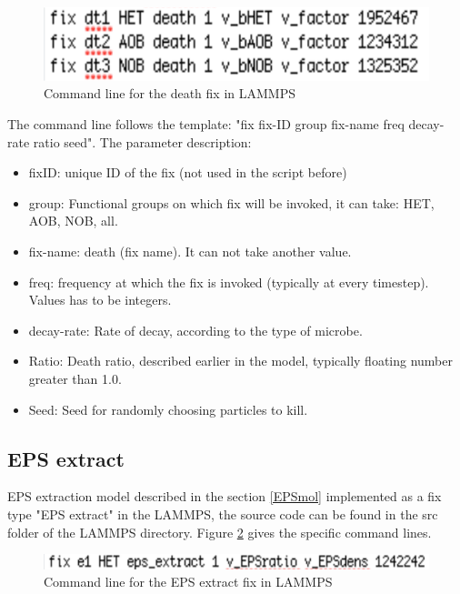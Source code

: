 \documentclass[11pt,a4paper,openright]{article}
\begin{document}
\begin{figure}[H]
\begin{center}
  \includegraphics[width=0.6\columnwidth]{Figs/deathfix.pdf}
\caption{Command line for the death fix in LAMMPS}
\label{fig:death}       %
\end{center}
\end{figure}

The command line follows the template: "fix fix-ID group fix-name freq decay-rate ratio seed". The parameter description:
\begin{itemize}
\item fixID: unique ID of the fix (not used in the script before)
\item group: Functional groups on which fix will be invoked, it can take: HET, AOB, NOB, all.
\item fix-name: death (fix name). It can not take another value.
\item freq: frequency at which the fix is invoked (typically at every timestep). Values has to be integers.
\item decay-rate: Rate of decay, according to the type of microbe.
\item Ratio: Death ratio, described earlier in the model, typically floating number greater than 1.0.
\item Seed: Seed for randomly choosing particles to kill. 
\end{itemize}

\subsection{EPS extract}
EPS extraction model described in the section \ref{EPSmol} implemented as a fix type "EPS extract" in the LAMMPS, the source code can be found in the src folder of the LAMMPS directory. Figure \ref{fig:EPS} gives the specific command lines.

\begin{figure}[H]
\begin{center}
  \includegraphics[width=0.6\columnwidth]{Figs/EPSfix.pdf}
\caption{Command line for the EPS extract fix in LAMMPS}
\label{fig:EPS}       %
\end{center}
\end{figure}
\end{document}
